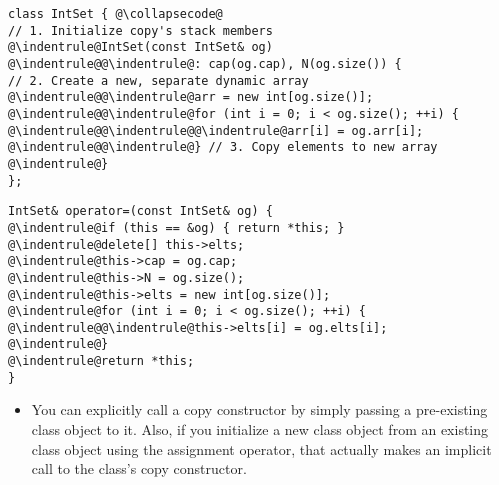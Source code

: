 \documentclass[6.6pt, twocolumn]{extarticle}
\newcommand{\iteminfo}{\item[\textcolor{info}{\scalebox{1.0}{\faInfoCircle}}]}
\begin{document}
\smallskip
\begin{minipage}[c]{5.2cm} 
   \begin{tcolorbox}[,toptitle=-0.6mm,
bottomtitle=-0.6mm,top=-4pt,bottom=-4pt,middle=-5pt,left=-7.5pt,right=0pt,,
adjusted title={Ex: Copy Ctor Implementation},fonttitle=\sffamily\bfseries
   ]
              {
\begin{lstlisting}[style = mystyle]
class IntSet { @\collapsecode@
// 1. Initialize copy's stack members
@\indentrule@IntSet(const IntSet& og) 
@\indentrule@@\indentrule@: cap(og.cap), N(og.size()) {
// 2. Create a new, separate dynamic array
@\indentrule@@\indentrule@arr = new int[og.size()];
@\indentrule@@\indentrule@for (int i = 0; i < og.size(); ++i) {
@\indentrule@@\indentrule@@\indentrule@arr[i] = og.arr[i]; 
@\indentrule@@\indentrule@} // 3. Copy elements to new array
@\indentrule@}
};
\end{lstlisting}
}
\end{tcolorbox} 
   \end{minipage}
   \hspace{0pt}
   \begin{minipage}[c]{5.0cm}
   \begin{tcolorbox}[,toptitle=-0.6mm,
bottomtitle=-0.6mm,top=-4pt,bottom=-4pt,middle=-5pt,left=-7.5pt,right=-0pt,,
adjusted title={Ex: Assignment Operator Overload},fonttitle=\sffamily\bfseries
   ]
              {
    \lstset{
    escapeinside=@@,
    literate=
}
\begin{lstlisting}[style = mystyle,numbers=none]
IntSet& operator=(const IntSet& og) {
@\indentrule@if (this == &og) { return *this; }
@\indentrule@delete[] this->elts;
@\indentrule@this->cap = og.cap;
@\indentrule@this->N = og.size();
@\indentrule@this->elts = new int[og.size()];
@\indentrule@for (int i = 0; i < og.size(); ++i) { 
@\indentrule@@\indentrule@this->elts[i] = og.elts[i];
@\indentrule@}
@\indentrule@return *this;
}
\end{lstlisting}
}
\end{tcolorbox} 
\end{minipage}

\begin{itemize}
\iteminfo You can explicitly call a copy constructor by simply passing a pre-existing class object to it. Also, if you initialize a new class object from an existing class object using the assignment operator, that actually makes an implicit call to the class's copy constructor.
\end{itemize}
\end{document}
